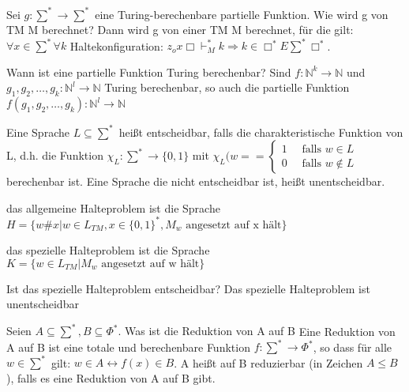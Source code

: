\documentclass[avery5371, frame]{flashcards}
\begin{document}
\begin{flashcard}[Satz]{ Sei $g:\sum^*\rightarrow\sum^*$ eine Turing-berechenbare partielle Funktion. Wie wird g von TM M berechnet?}
    Dann wird g von einer TM M berechnet, für die gilt: $\forall x\in\sum^*\forall k$ Haltekonfiguration: $z_ox\Box\vdash_M^* k\Rightarrow k\in \Box^*E\sum^*\Box^*$.
\end{flashcard}

\begin{flashcard}[Satz]{Wann ist eine partielle Funktion Turing berechenbar?}
    Sind $f:\mathbb{N}^k\rightarrow\mathbb{N}$ und $g_1,g_2,\dots,g_k:\mathbb{N}^l\rightarrow\mathbb{N}$ Turing berechenbar, so auch die partielle Funktion $f(g_1,g_2,\dots,g_k):\mathbb{N}^l\rightarrow\mathbb{N}$
\end{flashcard}

\begin{flashcard}[Definition]{ Eine Sprache $L\subseteq\sum^*$ heißt entscheidbar,}
    falls die charakteristische Funktion von L, d.h. die Funktion $\chi_L:\sum^*\rightarrow\{0,1\}$ mit $\chi_L(w= = \begin{cases} 1 \quad\text{ falls } w\in L \\ 0 \quad\text{ falls } w\not\in L \end{cases}$ berechenbar ist. Eine Sprache die nicht entscheidbar ist, heißt unentscheidbar.
\end{flashcard}

\begin{flashcard}[Definition]{ das allgemeine Halteproblem ist die Sprache }
    $H=\{w\#x | w\in L_{TM}, x\in\{0,1\}^*, M_w \text{ angesetzt auf x hält}\}$
\end{flashcard}

\begin{flashcard}[Definition]{ das spezielle Halteproblem ist die Sprache }
    $K=\{w\in L_{TM} | M_w \text{ angesetzt auf w hält}\}$
\end{flashcard}

\begin{flashcard}[Satz]{Ist das spezielle Halteproblem entscheidbar?}
    Das spezielle Halteproblem ist unentscheidbar
\end{flashcard}

\begin{flashcard}[Definition]{Seien $A\subseteq\sum^*,B\subseteq\Phi^*$. Was ist die Reduktion von A auf B}
    Eine Reduktion von A auf B ist eine totale und berechenbare Funktion $f:\sum^*\rightarrow\Phi^*$, so dass für alle $w\in\sum^*$ gilt: $w\in A\leftrightarrow f(x)\in B$. A heißt auf B reduzierbar (in Zeichen $A\leq B$), falls es eine Reduktion von A auf B gibt.
\end{flashcard}
\end{document}
